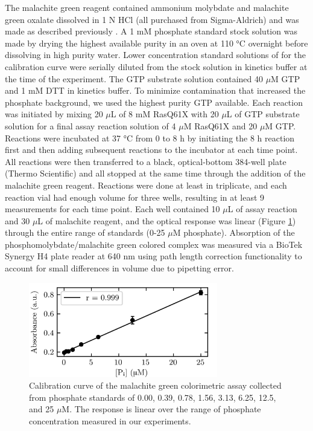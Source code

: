 The malachite green reagent contained ammonium molybdate and malachite green oxalate dissolved in 1 N HCl (all purchased from Sigma-Aldrich) and was made as described previously \cite{Quan2005}.
A 1 mM phosphate standard stock solution was made by drying the highest available purity  in an oven at 110 \si{\celsius} overnight before dissolving in high purity water. 
Lower concentration standard solutions of  for the calibration curve were serially diluted from the stock solution in kinetics buffer at the time of the experiment. 
The GTP substrate solution contained 40 $\mu$M GTP and 1 mM DTT in kinetics buffer. 
To minimize contamination that increased the phosphate background, we used the highest purity GTP available. 
Each reaction was initiated by mixing 20 $\mu$L of 8 mM RasQ61X with 20 $\mu$L of GTP substrate solution for a final assay reaction solution of 4 $\mu$M RasQ61X and 20 $\mu$M GTP. 
Reactions were incubated at 37 \si{\celsius} from 0 to 8 h by initiating the 8 h reaction first and then adding subsequent reactions to the incubator at each time point. 
All reactions were then transferred to a black, optical-bottom 384-well plate (Thermo Scientific) and all stopped at the same time through the addition of the malachite green reagent. 
Reactions were done at least in triplicate, and each reaction vial had enough volume for three wells, resulting in at least 9 measurements for each time point. 
Each well contained 10 $\mu$L of assay reaction and 30 $\mu$L of malachite reagent, and the optical response was linear (Figure \ref{fig:ras-response}) through the entire range of standards (0-25 $\mu$M phosphate). 
Absorption of the phosphomolybdate/malachite green colored complex was measured via a BioTek Synergy H4 plate reader at 640 nm using path length correction functionality to account for small differences in volume due to pipetting error.

\begin{figure}
    \center
    \includegraphics[width=3.25in]{figures-ras/optical_response.png}
    \caption{Calibration curve of the malachite green colorimetric assay collected from phosphate standards of 0.00, 0.39, 0.78, 1.56, 3.13, 6.25, 12.5, and 25 $\mu$M. The response is linear over the range of phosphate concentration measured in our experiments.}
    \label{fig:ras-response}

\end{figure}

